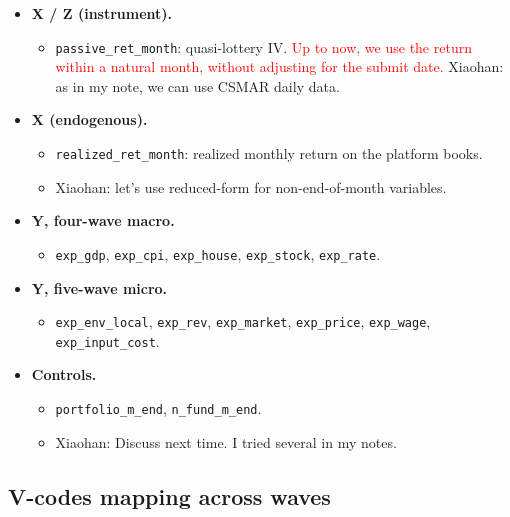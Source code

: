 \documentclass[11pt,letterpaper,english,final]{article}
\begin{document}
\begin{itemize}
\item \textbf{X / Z (instrument).}
  \begin{itemize}
    \item \texttt{passive\_ret\_month}: quasi-lottery IV. \textcolor{red}{Up to now, we use the return within a natural month, without adjusting for the submit date.} {\color{cyan}Xiaohan: as in my note, we can use CSMAR daily data.}
  \end{itemize}

\item \textbf{X (endogenous).} 
  \begin{itemize}
    \item \texttt{realized\_ret\_month}: realized monthly return on the platform books.
    \item {\color{cyan}Xiaohan: let's use reduced-form for non-end-of-month variables.}
  \end{itemize}

\item \textbf{Y, four-wave macro.}
  \begin{itemize}
    \item \texttt{exp\_gdp}, \texttt{exp\_cpi}, \texttt{exp\_house}, \texttt{exp\_stock}, \texttt{exp\_rate}.
  \end{itemize}

\item \textbf{Y, five-wave micro.} 
  \begin{itemize}
    \item \texttt{exp\_env\_local}, \texttt{exp\_rev}, \texttt{exp\_market}, \texttt{exp\_price}, \texttt{exp\_wage}, \texttt{exp\_input\_cost}.
  \end{itemize}

\item \textbf{Controls.} 
\begin{itemize}
  \item \texttt{portfolio\_m\_end}, \texttt{n\_fund\_m\_end}.
  \item {\color{cyan}Xiaohan: Discuss next time. I tried several in my notes.}
\end{itemize}

\end{itemize}

\subsection{V-codes mapping across waves}
\end{document}

